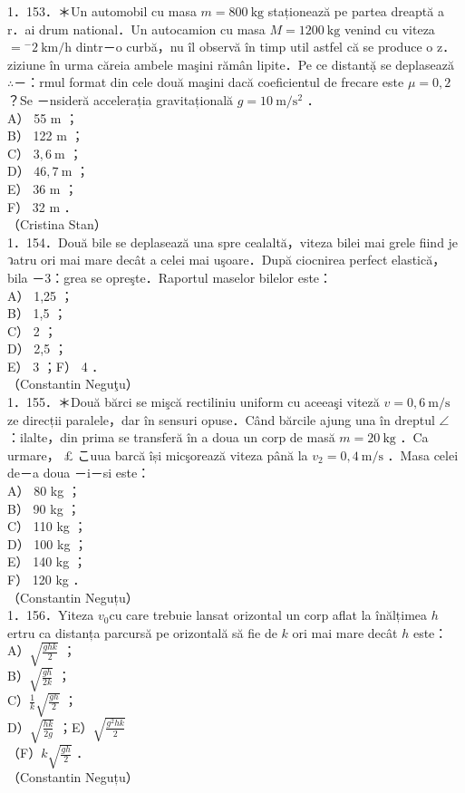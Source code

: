 \documentclass[10pt]{article}
\begin{document}
1．153．＊Un automobil cu masa $m=800 \mathrm{~kg}$ staționează pe partea dreaptă a r．ai drum national．Un autocamion cu masa $M=1200 \mathrm{~kg}$ venind cu viteza $={ }^{-} 2 \mathrm{~km} / \mathrm{h}$ dintr－o curbă，nu îl observă în timp util astfel că se produce o z．ziziune în urma căreia ambele maşini rămân lipite．Pe ce distantặ se deplasează $\therefore$－：rmul format din cele două maşini dacă coeficientul de frecare este $\mu=0,2$ ？Se －nsideră accelerația gravitațională $g=10 \mathrm{~m} / \mathrm{s}^{2}$ ．\\
A） 55 m ；\\
B） 122 m ；\\
C） $3,6 \mathrm{~m}$ ；\\
D） $46,7 \mathrm{~m}$ ；\\
E） 36 m ；\\
F） 32 m ．\\
（Cristina Stan）\\
1．154．Două bile se deplasează una spre cealaltă，viteza bilei mai grele fiind je วatru ori mai mare decât a celei mai uşoare．După ciocnirea perfect elastică，bila －3：grea se opreşte．Raportul maselor bilelor este：\\
A） 1,25 ；\\
B） 1,5 ；\\
C） 2 ；\\
D） 2,5 ；\\
E） 3 ；F） 4 ．\\
（Constantin Neguţu）\\
1．155．＊Două bărci se mişcă rectiliniu uniform cu aceeaşi viteză $v=0,6 \mathrm{~m} / \mathrm{s}$ ze direcții paralele，dar în sensuri opuse．Când bărcile ajung una în dreptul $\angle$ ：ilalte，din prima se transferă în a doua un corp de masă $m=20 \mathrm{~kg}$ ．Ca urmare， £ こuua barcă își micşorează viteza până la $v_{2}=0,4 \mathrm{~m} / \mathrm{s}$ ．Masa celei de－a doua －i－si este：\\
A） 80 kg ；\\
B） 90 kg ；\\
C） 110 kg ；\\
D） 100 kg ；\\
E） 140 kg ；\\
F） 120 kg ．\\
（Constantin Neguțu）\\
1．156．Yiteza $v_{0} \mathrm{cu}$ care trebuie lansat orizontal un corp aflat la înălțimea $h$ ertru ca distanța parcursă pe orizontală să fie de $k$ ori mai mare decât $h$ este：\\
A）$\sqrt{\frac{g h k}{2}}$ ；\\
B）$\sqrt{\frac{g h}{2 k}}$ ；\\
C）$\frac{1}{k} \sqrt{\frac{g h}{2}}$ ；\\
D）$\sqrt{\frac{h k}{2 g}}$ ；E）$\sqrt{\frac{g^{2} h k}{2}}$\\
（F）$k \sqrt{\frac{g h}{2}}$ ．\\
（Constantin Neguțu）
\end{document}
